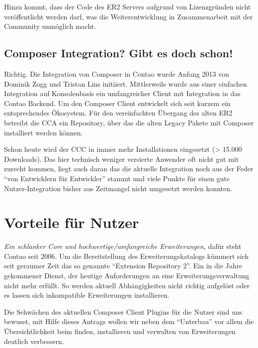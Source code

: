 \documentclass[
paper=a4,
draft=false,%
fontsize=10pt%
]{scrartcl}
\begin{document}
Hinzu kommt, dass der Code des ER2 Servers aufgrund von Lizenzgründen nicht veröffentlicht werden darf, was die Weiterentwicklung in Zusammenarbeit mit der Community unmöglich macht. 

\subsection{Composer Integration? Gibt es doch schon!}

Richtig. Die Integration von Composer in Contao wurde Anfang 2013 von Dominik Zogg und Tristan Lins initiiert. Mittlerweile wurde aus einer einfachen Integration auf Konsolenbasis ein umfangreicher Client mit Integration in das Contao Backend. Um den Composer Client entwickelt sich seit kurzem ein entsprechendes Ökosystem. Für den vereinfachten Übergang des alten ER2 betreibt die CCA ein Repository, über das die alten Legacy Pakete mit Composer installiert werden können.

Schon heute wird der CCC in immer mehr Installationen eingesetzt (> 15.000 Downloads). Das hier technisch weniger versierte Anwender oft nicht gut mit zurecht kommen, liegt auch daran das die aktuelle Integration noch aus der Feder “von Entwicklern für Entwickler” stammt und viele Punkte für einen gute Nutzer-Integration bisher aus Zeitmangel nicht umgesetzt werden konnten.

%
%

\newpage

\section{Vorteile für Nutzer}

\textit{Ein schlanker Core und hochwertige/umfangreiche Erweiterungen}, dafür steht Contao seit 2006. Um die Bereitstellung des Erweiterungskatalogs kümmert sich seit geraumer Zeit das so genannte “Extension Repository 2”. Ein in die Jahre gekommener Dienst, der heutige Anforderungen an eine Erweiterungsverwaltung nicht mehr erfüllt. So werden aktuell Abhängigkeiten nicht richtig aufgelöst oder es lassen sich inkompatible Erweiterungen installieren.

Die Schwächen des aktuellen Composer Client Plugins für die Nutzer sind uns bewusst, mit Hilfe dieses Antrags wollen wir neben dem “Unterbau” vor allem die Übersichtlichkeit beim finden, installieren und verwalten von Erweiterungen deutlich verbessern.
\end{document}
